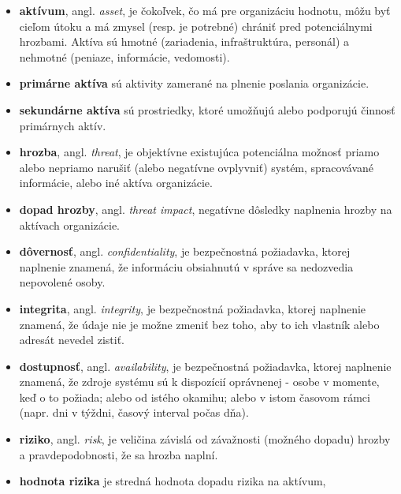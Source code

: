 \begin{itemize}
  \item \textbf{aktívum}, angl. \textit{asset}, je čokoľvek, čo má pre organizáciu hodnotu, môžu byť cieľom útoku a má zmysel 
    (resp. je potrebné) chrániť pred potenciálnymi hrozbami. Aktíva sú hmotné (zariadenia, infraštruktúra, personál) a nehmotné
    (peniaze, informácie, vedomosti).

  \item \textbf{primárne aktíva} sú aktivity zamerané na plnenie poslania organizácie. 

  \item \textbf{sekundárne aktíva} sú prostriedky, ktoré umožňujú alebo podporujú činnosť primárnych aktív. 

  \item \textbf{hrozba}, angl. \textit{threat}, je objektívne existujúca potenciálna možnosť priamo alebo nepriamo narušiť
    (alebo negatívne ovplyvniť) systém, spracovávané informácie, alebo iné aktíva organizácie.

  \item \textbf{dopad hrozby}, angl. \textit{threat impact}, negatívne dôsledky naplnenia hrozby na aktívach organizácie.

  \item \textbf{dôvernosť}, angl. \textit{confidentiality}, je bezpečnostná požiadavka, ktorej naplnenie znamená, že informáciu
    obsiahnutú v správe sa nedozvedia nepovolené osoby.

  \item \textbf{integrita}, angl. \textit{integrity}, je bezpečnostná požiadavka, ktorej naplnenie znamená, že údaje nie je
    možne zmeniť bez toho, aby to ich vlastník alebo adresát nevedel zistiť.

  \item \textbf{dostupnosť}, angl. \textit{availability}, je bezpečnostná požiadavka, ktorej naplnenie znamená, že zdroje systému
    sú k dispozícií oprávnenej - osobe v momente, keď o to požiada; alebo od istého okamihu; alebo v istom časovom rámci
    (napr. dni v týždni, časový interval počas dňa).

  \item \textbf{riziko}, angl. \textit{risk}, je veličina závislá od závažnosti (možného dopadu) hrozby a pravdepodobnosti, 
    že sa hrozba naplní.


  \item \textbf{hodnota rizika} je stredná hodnota dopadu rizika na aktívum, 


\end{itemize}
